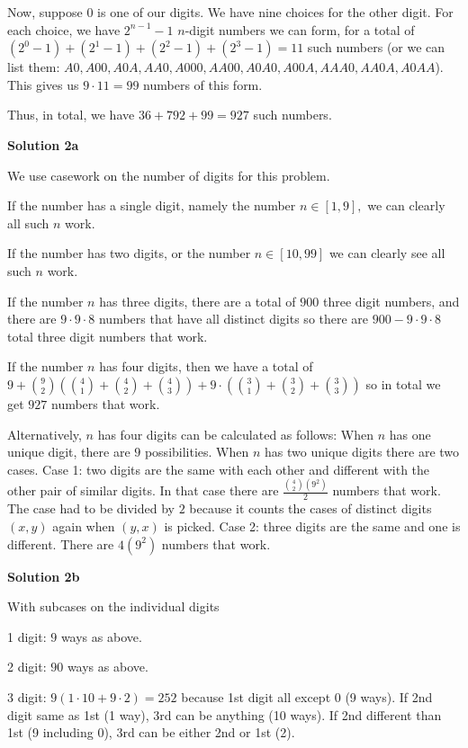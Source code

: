 \begin{enumerate}
 Now, suppose 0 is one of our digits.  We have nine choices for the other digit.  For each choice, we have $2^{n - 1} - 1$ $n$-digit numbers we can form, for a total of $(2^0 - 1) + (2^1 - 1) + (2^2 - 1) + (2^3 - 1) = 11$ such numbers (or we can list them: $A0, A00, A0A, AA0, A000, AA00, A0A0, A00A, AAA0, AA0A, A0AA$).  This gives us $9\cdot 11 = 99$ numbers of this form.

 Thus, in total, we have $36 + 792 + 99 = \boxed{927}$ such numbers.

 



\textbf{Solution 2a}

We use casework on the number of digits for this problem.

 If the number has a single digit, namely the number $n \in [1,9],$ we can clearly all such $n$ work.

 If the number has two digits, or the number $n \in [10,99]$ we can clearly see all such $n$ work.

 If the number $n$ has three digits, there are a total of $900$ three digit numbers, and there are $9 \cdot 9 \cdot 8$ numbers that have all distinct digits so there are $900 - 9 \cdot 9 \cdot 8$ total three digit numbers that work.

 If the number $n$ has four digits, then we have a total of $9 +\binom{9}{2}\left(\binom{4}{1}+\binom{4}{2} +\binom{4}{3}\right) + 9 \cdot \left(\binom{3}{1}+\binom{3}{2} +\binom{3}{3}\right)$ so in total we get $\boxed{927}$ numbers that work.

 
Alternatively, $n$ has four digits can be calculated as follows: When $n$ has one unique digit, there are $9$ possibilities. When $n$ has two unique digits there are two cases. Case 1: two digits are the same with each other and different with the other pair of similar digits. In that case there are $\frac{\binom{4}{2}(9^2)}{2}$ numbers that work. The case had to be divided by $2$ because it counts the cases of distinct digits $(x,y)$ again when $(y,x)$ is picked. Case 2: three digits are the same and one is different. There are $4(9^2)$ numbers that work.

 



\textbf{Solution 2b}

With subcases on the individual digits

 1 digit: $9$ ways as above.

 2 digit: $90$ ways as above.

 3 digit: $9(1\cdot10+9\cdot2)=252$ because 1st digit all except $0$ (9 ways). If 2nd digit same as 1st (1 way), 3rd can be anything (10 ways). If 2nd different than 1st (9 including 0), 3rd can be either 2nd or 1st (2). 


\end{enumerate}
